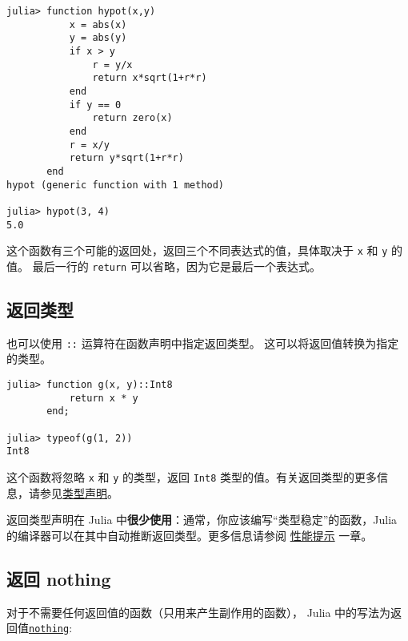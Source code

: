 \begin{verbatim}
julia> function hypot(x,y)
           x = abs(x)
           y = abs(y)
           if x > y
               r = y/x
               return x*sqrt(1+r*r)
           end
           if y == 0
               return zero(x)
           end
           r = x/y
           return y*sqrt(1+r*r)
       end
hypot (generic function with 1 method)

julia> hypot(3, 4)
5.0
\end{verbatim}



这个函数有三个可能的返回处，返回三个不同表达式的值，具体取决于 \texttt{x} 和 \texttt{y} 的值。 最后一行的 \texttt{return} 可以省略，因为它是最后一个表达式。



\hypertarget{3145756716608098346}{}


\subsection{返回类型}



也可以使用 \texttt{::} 运算符在函数声明中指定返回类型。 这可以将返回值转换为指定的类型。




\begin{verbatim}
julia> function g(x, y)::Int8
           return x * y
       end;

julia> typeof(g(1, 2))
Int8
\end{verbatim}



这个函数将忽略 \texttt{x} 和 \texttt{y} 的类型，返回 \texttt{Int8} 类型的值。有关返回类型的更多信息，请参见\href{@ref Type-Declarations}{类型声明}。



返回类型声明在 Julia 中\textbf{很少使用}：通常，你应该编写“类型稳定”的函数，Julia 的编译器可以在其中自动推断返回类型。更多信息请参阅 \hyperlink{818954303942149020}{性能提示} 一章。



\hypertarget{4035355918680861810}{}


\subsection{返回 nothing}



对于不需要任何返回值的函数（只用来产生副作用的函数）， Julia 中的写法为返回值\hyperlink{9331422207248206047}{\texttt{nothing}}:




